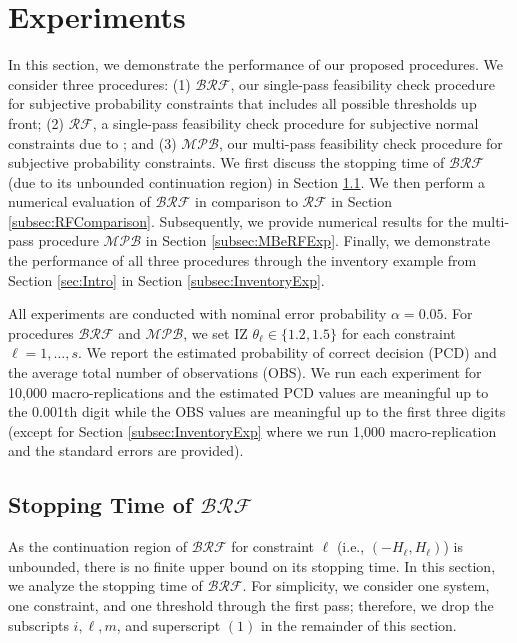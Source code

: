 \documentclass[11pt]{article}
\begin{document}
\section{Experiments}
\label{sec:experiments}

In this section, we demonstrate the performance of our proposed procedures. We consider three procedures: (1) $\mathcal{BRF}$, our single-pass feasibility check procedure for subjective probability constraints that includes all possible thresholds up front; (2) $\mathcal{RF}$, a single-pass feasibility check procedure for subjective normal constraints due to \citet{zhou2022finding}; and (3) $\mathcal{MPB}$, our multi-pass feasibility check procedure for subjective probability constraints. 
We first discuss the stopping time of $\mathcal{BRF}$ (due to its unbounded continuation region) in Section \ref{subsec:BRFStoppingTime}. 
We then perform a numerical evaluation of $\mathcal{BRF}$ in comparison to $\mathcal{RF}$ in Section \ref{subsec:RFComparison}. Subsequently, we provide numerical results for the multi-pass procedure $\mathcal{MPB}$ in Section \ref{subsec:MBeRFExp}. Finally, we demonstrate the performance of all three procedures through the inventory example from Section \ref{sec:Intro} in Section \ref{subsec:InventoryExp}. 

All experiments are conducted with nominal error probability $\alpha = 0.05$. For procedures $\mathcal{BRF}$ and $\mathcal{MPB}$, we set IZ $\theta_\ell\in \{1.2, 1.5\}$ for each constraint $\ell=1,\ldots,s$. 
We report the estimated probability of correct decision (PCD) and the average total number of observations (OBS). We run each experiment for 10,000 macro-replications and the estimated PCD values are meaningful up to the 0.001th digit while the OBS values are meaningful up to the first three digits (except for Section \ref{subsec:InventoryExp} where we run 1,000 macro-replication and the standard errors are provided).

\subsection{Stopping Time of $\mathcal{BRF}$}
\label{subsec:BRFStoppingTime}


As the continuation region of $\mathcal{BRF}$ for constraint $\ell$ (i.e., $(-H_\ell, H_\ell)$) is unbounded, there is no finite upper bound on its stopping time. In this section, we analyze the stopping time of $\mathcal{BRF}$. For simplicity, we consider one system, one constraint, and one threshold through the first pass; therefore, we drop the subscripts $i, \ell, m$, and superscript $(1)$ in the remainder of this section. 
\end{document}

